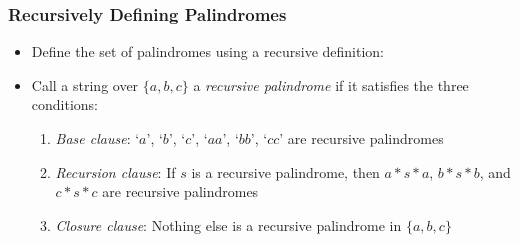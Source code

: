 \begin{frame}
\frametitle{Recursively Defining Palindromes}

\begin{itemize}[<+->]

\item Define the set of palindromes using a recursive definition: 

\item Call a string over $\{a,b,c\}$ a \emph{recursive palindrome} if it satisfies the three conditions:

\begin{enumerate}
\item {\emph{Base clause}}: `$a$', `$b$', `$c$', `$aa$', `$bb$', `$cc$'  are recursive palindromes

\item {\emph{Recursion clause}}: If $s$ is a recursive palindrome, then $a*s*a$, \phantom{vvvvvvvvvvvvvv} $b*s*b$, and $c*s*c$ are recursive palindromes

\item {\emph{Closure clause}}: Nothing else is a recursive palindrome in $\{a,b,c\}$
\end{enumerate}

\end{itemize} 
\end{frame}

